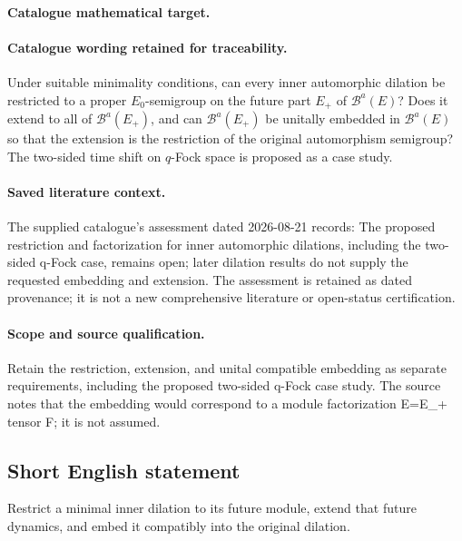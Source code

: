 \documentclass[11pt]{article}
\begin{document}
\paragraph{Catalogue mathematical target.}
\paragraph{Catalogue wording retained for traceability.}
Under suitable minimality conditions, can every inner automorphic dilation be restricted to a proper $E_0$-semigroup on the future part $E_+$ of $\mathcal B^a(E)$? Does it extend to all of $\mathcal B^a(E_+)$, and can $\mathcal B^a(E_+)$ be unitally embedded in $\mathcal B^a(E)$ so that the extension is the restriction of the original automorphism semigroup? The two-sided time shift on $q$-Fock space is proposed as a case study.

\paragraph{Saved literature context.} The supplied catalogue's assessment dated 2026-08-21 records: The proposed restriction and factorization for inner automorphic dilations, including the two-sided q-Fock case, remains open; later dilation results do not supply the requested embedding and extension. The assessment is retained as dated provenance; it is not a new comprehensive literature or open-status certification.
\paragraph{Scope and source qualification.}Retain the restriction, extension, and unital compatible embedding as separate requirements, including the proposed two-sided q-Fock case study. The source notes that the embedding would correspond to a module factorization E=E_+ tensor F; it is not assumed.
\subsection{Short English statement}
Restrict a minimal inner dilation to its future module, extend that future dynamics, and embed it compatibly into the original dilation.
\end{document}
